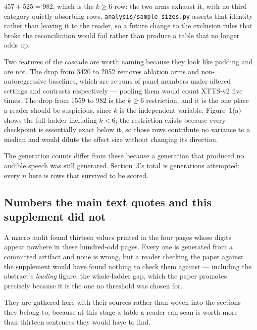 \documentclass[11pt]{article}
\begin{document}
\noindent $457 + 525 = 982$, which is the $k\ge6$ row: the two arms exhaust it,
with no third category quietly absorbing rows. \texttt{analysis/sample\_sizes.py}
asserts that identity rather than leaving it to the reader, so a future change to
the exclusion rules that broke the reconciliation would fail rather than produce
a table that no longer adds up.

Two features of the cascade are worth naming because they look like padding and
are not. The drop from 3420 to 2052 removes ablation arms and non-autoregressive
baselines, which are re-runs of panel members under altered settings and
contrasts respectively --- pooling them would count XTTS-v2 five times. The drop
from 1559 to 982 is the $k\ge6$ restriction, and it is the one place a reader
should be suspicious, since $k$ is the independent variable. Figure~1(a) shows
the full ladder including $k<6$; the restriction exists because every checkpoint
is essentially exact below it, so those rows contribute no variance to a median
and would dilute the effect size without changing its direction.

The generation counts differ from these because a generation that produced no
audible speech was still generated. Section~3's total is generations attempted;
every $n$ here is rows that survived to be scored.


\subsection{Numbers the main text quotes and this supplement did not}

A macro audit found thirteen values printed in the four pages whose digits appear
nowhere in these hundred-odd pages. Every one is generated from a committed
artifact and none is wrong, but a reader checking the paper against the
supplement would have found nothing to check them against --- including the
abstract's \emph{leading} figure, the whole-ladder gap, which the paper promotes
precisely because it is the one no threshold was chosen for.

They are gathered here with their sources rather than woven into the sections
they belong to, because at this stage a table a reader can scan is worth more
than thirteen sentences they would have to find.
\end{document}
